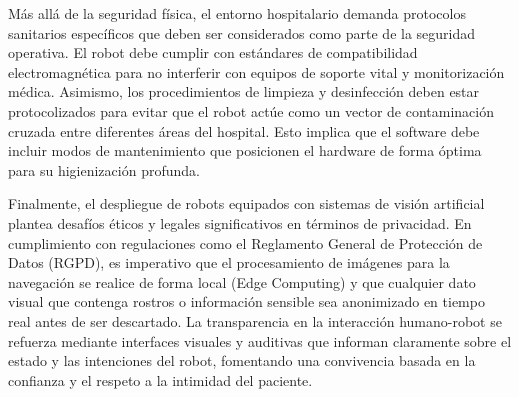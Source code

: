 Más allá de la seguridad física, el entorno hospitalario demanda protocolos sanitarios específicos que deben ser considerados como parte de la seguridad operativa. El robot debe cumplir con estándares de compatibilidad electromagnética para no interferir con equipos de soporte vital y monitorización médica. Asimismo, los procedimientos de limpieza y desinfección deben estar protocolizados para evitar que el robot actúe como un vector de contaminación cruzada entre diferentes áreas del hospital. Esto implica que el software debe incluir modos de mantenimiento que posicionen el hardware de forma óptima para su higienización profunda.

Finalmente, el despliegue de robots equipados con sistemas de visión artificial plantea desafíos éticos y legales significativos en términos de privacidad. En cumplimiento con regulaciones como el Reglamento General de Protección de Datos (RGPD), es imperativo que el procesamiento de imágenes para la navegación se realice de forma local (Edge Computing) y que cualquier dato visual que contenga rostros o información sensible sea anonimizado en tiempo real antes de ser descartado. La transparencia en la interacción humano-robot se refuerza mediante interfaces visuales y auditivas que informan claramente sobre el estado y las intenciones del robot, fomentando una convivencia basada en la confianza y el respeto a la intimidad del paciente.
